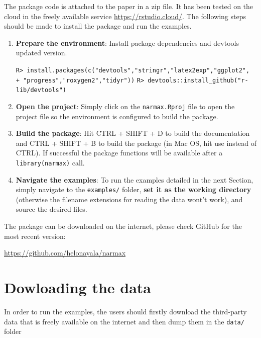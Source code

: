 \documentclass[preprint,12pt, a4paper]{elsarticle}
\begin{document}
The package code is attached to the paper in a zip file. It has been tested on the cloud in the freely available service \url{https://rstudio.cloud/}. The following steps should be made to install the package and run the examples.
\begin{enumerate}[Step 1:]
	\item \textbf{Prepare the environment}: Install package dependencies and devtools updated version.
	
	\verb|R> install.packages(c("devtools","stringr","latex2exp","ggplot2",|
	\verb|	+ "progress","roxygen2","tidyr"))|
	\verb|R> devtools::install_github("r-lib/devtools")|
	
	\item \textbf{Open the project}: Simply click on the \verb|narmax.Rproj| file to open the project file so the environment is configured to build the package.
	
	\item \textbf{Build the package}: Hit CTRL + SHIFT + D to build the documentation and CTRL + SHIFT + B to build the package (in Mac OS, hit use instead of CTRL). If successful the package functions will be available after a \verb|library(narmax)| call.
	
	\item \textbf{Navigate the examples}: To run the examples detailed in the next Section, simply navigate to the \verb|examples/| folder, \textbf{set it as the working directory} (otherwise the filename extensions for reading the data wont't work), and source the desired files.		
\end{enumerate}

The package can be downloaded on the internet, please check GitHub for the most recent version:

\url{https://github.com/helonayala/narmax}

\section{Dowloading the data}  \label{sec:examples}

In order to run the examples, the users should firstly download the third-party data that is freely available on the internet and then dump them in the \verb|data/| folder  
\end{document}
